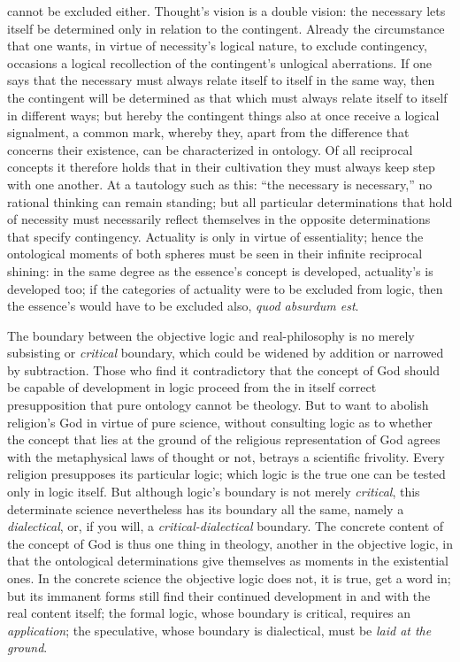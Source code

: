 \documentclass[12pt]{book}
\begin{document}
cannot be excluded either. Thought's vision is a double vision: the
necessary lets itself be determined only in relation to the contingent.
Already the circumstance that one wants, in virtue of necessity's logical
nature, to exclude contingency, occasions a logical recollection of the
contingent's unlogical aberrations. If one says that the necessary must
always relate itself to itself in the same way, then the contingent will be
determined as that which must always relate itself to itself in different
ways; but hereby the contingent things also at once receive a logical
signalment, a common mark, whereby they, apart from the difference that
concerns their existence, can be characterized in ontology. Of all
reciprocal concepts it therefore holds that in their cultivation they must
always keep step with one another. At a tautology such as this: ``the
necessary is necessary,'' no rational thinking can remain standing; but all
particular determinations that hold of necessity must necessarily reflect
themselves in the opposite determinations that specify contingency.
Actuality is only in virtue of essentiality; hence the ontological moments
of both spheres must be seen in their infinite reciprocal shining: in the
same degree as the essence's concept is developed, actuality's is developed
too; if the categories of actuality were to be excluded from logic, then the
essence's would have to be excluded also, \textit{quod absurdum est}.

The boundary between the objective logic and real-philosophy is no merely
subsisting or \emph{critical} boundary, which could be widened by addition
or narrowed by subtraction. Those who find it contradictory that the concept
of God should be capable of development in logic proceed from the in itself
correct presupposition that pure ontology cannot be theology. But to want to
abolish religion's God in virtue of pure science, without consulting logic
as to whether the concept that lies at the ground of the religious
representation of God agrees with the metaphysical laws of thought or not,
betrays a scientific frivolity. Every religion presupposes its particular
logic; which logic is the true one can be tested only in logic itself. But
although logic's boundary is not merely \emph{critical}, this determinate
science nevertheless has its boundary all the same, namely a
\emph{dialectical}, or, if you will, a \emph{critical-dialectical}
boundary. The concrete content of the concept of God is thus one thing in
theology, another in the objective logic, in that the ontological
determinations give themselves as moments in the existential ones. In the
concrete science the objective logic does not, it is true, get a word in;
but its immanent forms still find their continued development in and with
the real content itself; the formal logic, whose boundary is critical,
requires an \emph{application}; the speculative, whose boundary is
dialectical, must be \emph{laid at the ground}.
\end{document}
